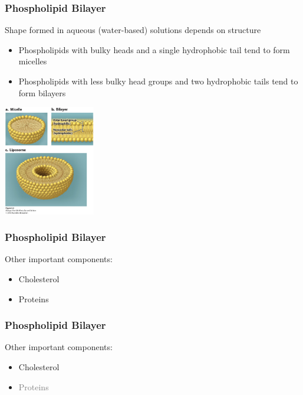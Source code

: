 \documentclass[10pt]{beamer}
\begin{document}
\begin{frame}[t]
\frametitle{Phospholipid Bilayer}
\vspace{0.5cm}

	Shape formed in aqueous (water-based) solutions depends on structure\\
	\medskip
	
		\begin{itemize}
			\item Phospholipids with bulky heads and a single hydrophobic tail tend to form micelles
			\medskip
			\item Phospholipids with less bulky head groups and two hydrophobic tails tend to form bilayers
		\end{itemize}	

	\vspace{0.25cm}
	
	\begin{center}
		\includegraphics[width=0.3\textwidth]{figures/figure_05_03.jpg}
	\end{center}	
\end{frame}


\begin{frame}[t]
\frametitle{Phospholipid Bilayer}
\vspace{0.5cm}

	Other important components:
	\medskip
	
		\begin{itemize}
			\item Cholesterol
			\medskip
			\item Proteins
		\end{itemize}	
\end{frame}


\begin{frame}[t]
\frametitle{Phospholipid Bilayer}
\vspace{0.5cm}

	Other important components:
	\medskip
	
		\begin{itemize}
			\item Cholesterol
			\medskip
			\item \textcolor{gray}{Proteins}
		\end{itemize}	
\end{frame}
\end{document}
